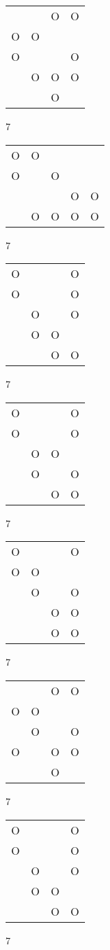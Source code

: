 \begin{tabular}{|m{0.2cm}m{0.2cm}m{0.2cm}m{0.2cm}|}\hline
 & &O&O\\
O&O& & \\
O& & &O\\
 &O&O&O\\
 & &O& \\
\hline\end{tabular}7
\begin{tabular}{|m{0.2cm}m{0.2cm}m{0.2cm}m{0.2cm}m{0.2cm}|}\hline
O&O& & & \\
O& &O& & \\
 & & &O&O\\
 &O&O&O&O\\
\hline\end{tabular}7
\begin{tabular}{|m{0.2cm}m{0.2cm}m{0.2cm}m{0.2cm}|}\hline
O& & &O\\
O& & &O\\
 &O& &O\\
 &O&O& \\
 & &O&O\\
\hline\end{tabular}7
\begin{tabular}{|m{0.2cm}m{0.2cm}m{0.2cm}m{0.2cm}|}\hline
O& & &O\\
O& & &O\\
 &O&O& \\
 &O& &O\\
 & &O&O\\
\hline\end{tabular}7
\begin{tabular}{|m{0.2cm}m{0.2cm}m{0.2cm}m{0.2cm}|}\hline
O& & &O\\
O&O& & \\
 &O& &O\\
 & &O&O\\
 & &O&O\\
\hline\end{tabular}7
\begin{tabular}{|m{0.2cm}m{0.2cm}m{0.2cm}m{0.2cm}|}\hline
 & &O&O\\
O&O& & \\
 &O& &O\\
O& &O&O\\
 & &O& \\
\hline\end{tabular}7
\begin{tabular}{|m{0.2cm}m{0.2cm}m{0.2cm}m{0.2cm}|}\hline
O& & &O\\
O& & &O\\
 &O& &O\\
 &O&O& \\
 & &O&O\\
\hline\end{tabular}7
